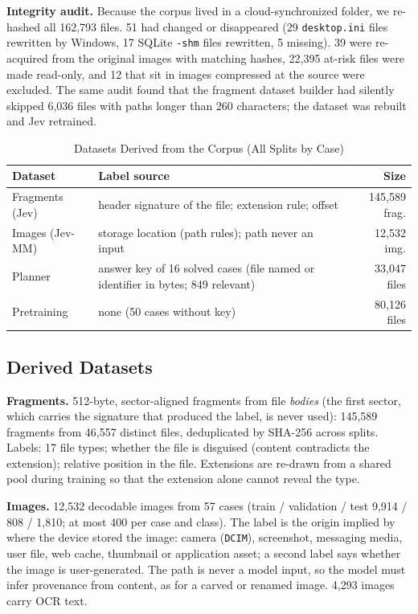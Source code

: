 \documentclass[conference]{IEEEtran}
\begin{document}
\textbf{Integrity audit.} Because the corpus lived in a cloud-synchronized folder, we re-hashed all 162{,}793 files.
51 had changed or disappeared (29 \texttt{desktop.ini} files rewritten by Windows, 17 SQLite \texttt{-shm} files
rewritten, 5 missing). 39 were re-acquired from the original images with matching hashes, 22{,}395 at-risk files
were made read-only, and 12 that sit in images compressed at the source were excluded. The same audit found that the
fragment dataset builder had silently skipped 6{,}036 files with paths longer than 260 characters; the dataset was
rebuilt and Jev retrained.

\begin{table}[t]
\caption{Datasets Derived from the Corpus (All Splits by Case)}
\label{tab:data}
\centering
\small
\setlength{\tabcolsep}{4pt}
\begin{tabular}{@{}p{1.75cm}p{3.75cm}r@{}}
\toprule
\textbf{Dataset} & \textbf{Label source} & \textbf{Size} \\
\midrule
Fragments (Jev) & header signature of the file; extension rule; offset & 145{,}589 frag. \\
Images (Jev-MM) & storage location (path rules); path never an input & 12{,}532 img. \\
Planner & answer key of 16 solved cases (file named or identifier in bytes; 849 relevant) & 33{,}047 files \\
Pretraining & none (50 cases without key) & 80{,}126 files \\
\bottomrule
\end{tabular}
\end{table}

\subsection{Derived Datasets}
\textbf{Fragments.} 512-byte, sector-aligned fragments from file \emph{bodies} (the first sector, which carries the
signature that produced the label, is never used): 145{,}589 fragments from 46{,}557 distinct files, deduplicated by
SHA-256 across splits. Labels: 17 file types; whether the file is disguised (content contradicts the extension);
relative position in the file. Extensions are re-drawn from a shared pool during training so that the extension alone
cannot reveal the type.

\textbf{Images.} 12{,}532 decodable images from 57 cases (train / validation / test 9{,}914 / 808 / 1{,}810; at most
400 per case and class). The label is the origin implied by where the device stored the image: camera
(\texttt{DCIM}), screenshot, messaging media, user file, web cache, thumbnail or application asset; a second label
says whether the image is user-generated. The path is never a model input, so the model must infer provenance from
content, as for a carved or renamed image. 4{,}293 images carry OCR text.
\end{document}
